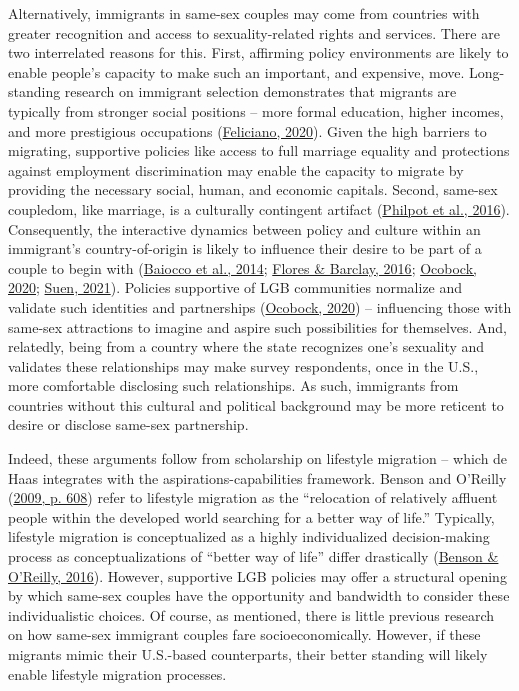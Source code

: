 \documentclass[
  11pt,
]{article}
\begin{document}
Alternatively, immigrants in same-sex couples may come from countries with greater recognition and access to sexuality-related rights and services. There are two interrelated reasons for this. First, affirming policy environments are likely to enable people's capacity to make such an important, and expensive, move. Long-standing research on immigrant selection demonstrates that migrants are typically from stronger social positions -- more formal education, higher incomes, and more prestigious occupations (\protect\hyperlink{ref-feliciano_2020}{Feliciano, 2020}). Given the high barriers to migrating, supportive policies like access to full marriage equality and protections against employment discrimination may enable the capacity to migrate by providing the necessary social, human, and economic capitals. Second, same-sex coupledom, like marriage, is a culturally contingent artifact (\protect\hyperlink{ref-philpot_2016_gay}{Philpot et al., 2016}). Consequently, the interactive dynamics between policy and culture within an immigrant's country-of-origin is likely to influence their desire to be part of a couple to begin with (\protect\hyperlink{ref-baiocco_2014_desire}{Baiocco et al., 2014}; \protect\hyperlink{ref-flores_2016_backlash}{Flores \& Barclay, 2016}; \protect\hyperlink{ref-ocobock_2020_leveraging}{Ocobock, 2020}; \protect\hyperlink{ref-suen_2021_sexual}{Suen, 2021}). Policies supportive of LGB communities normalize and validate such identities and partnerships (\protect\hyperlink{ref-ocobock_2020_leveraging}{Ocobock, 2020}) -- influencing those with same-sex attractions to imagine and aspire such possibilities for themselves. And, relatedly, being from a country where the state recognizes one's sexuality and validates these relationships may make survey respondents, once in the U.S., more comfortable disclosing such relationships. As such, immigrants from countries without this cultural and political background may be more reticent to desire or disclose same-sex partnership.

Indeed, these arguments follow from scholarship on lifestyle migration -- which de Haas integrates with the aspirations-capabilities framework. Benson and O'Reilly (\protect\hyperlink{ref-benson_2009}{2009, p. 608}) refer to lifestyle migration as the ``relocation of relatively affluent people within the developed world searching for a better way of life.'' Typically, lifestyle migration is conceptualized as a highly individualized decision-making process as conceptualizations of ``better way of life'' differ drastically (\protect\hyperlink{ref-benson_2016}{Benson \& O'Reilly, 2016}). However, supportive LGB policies may offer a structural opening by which same-sex couples have the opportunity and bandwidth to consider these individualistic choices. Of course, as mentioned, there is little previous research on how same-sex immigrant couples fare socioeconomically. However, if these migrants mimic their U.S.-based counterparts, their better standing will likely enable lifestyle migration processes.
\end{document}
